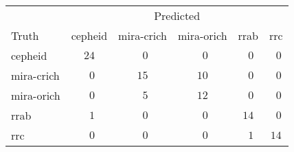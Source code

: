 \begin{tabular}{lccccc}
\hline
 & \multicolumn{5}{c}{Predicted} \\ 
Truth  & cepheid & mira-crich & mira-orich & rrab & \multicolumn{1}{c}{rrc} \\ 
\hline
cepheid  & $24$ & $\phantom{0}0$ & $\phantom{0}0$ & $\phantom{0}0$ & $\phantom{0}0$ \\
mira-crich  & $\phantom{0}0$ & $15$ & $10$ & $\phantom{0}0$ & $\phantom{0}0$ \\
mira-orich  & $\phantom{0}0$ & $\phantom{0}5$ & $12$ & $\phantom{0}0$ & $\phantom{0}0$ \\
rrab  & $\phantom{0}1$ & $\phantom{0}0$ & $\phantom{0}0$ & $14$ & $\phantom{0}0$ \\
rrc  & $\phantom{0}0$ & $\phantom{0}0$ & $\phantom{0}0$ & $\phantom{0}1$ & $14$ \\
\hline 
\end{tabular}
